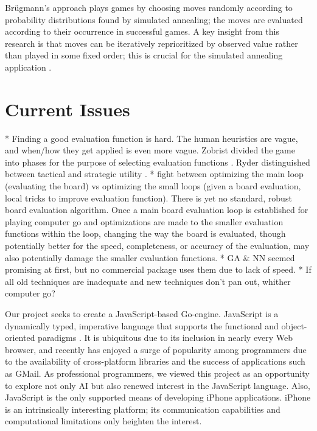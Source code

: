 \documentclass{memoir}
\begin{document}
Br\"ugmann's approach plays games by choosing moves randomly according to probability distributions found by simulated annealing; the moves are evaluated according to their occurrence in successful games. A key insight from this research is that moves can be iteratively reprioritized by observed value rather than played in some fixed order; this is crucial for the simulated annealing application \cite{Bruegmann93}.

\chapter{Current Issues}

    * Finding a good evaluation function is hard. The human heuristics are vague, and when/how they get applied is even more vague. Zobrist divided the game into phases for the purpose of selecting evaluation functions \cite{Zobrist1970b}. Ryder distinguished between tactical and strategic utility \cite{Burmeister}.
    * fight between optimizing the main loop (evaluating the board) vs optimizing the small loops (given a board evaluation, local tricks to improve evaluation function). There is yet no standard, robust board evaluation algorithm. Once a main board evaluation loop is established for playing computer go and optimizations are made to the smaller evaluation functions within the loop, changing the way the board is evaluated, though potentially better for the speed, completeness, or accuracy of the evaluation, may also potentially damage the smaller evaluation functions.
    * GA \& NN seemed promising at first, but no commercial package uses them due to lack of speed.
    * If all old techniques are inadequate and new techniques don't pan out, whither computer go? 

Our project seeks to create a JavaScript-based Go-engine. JavaScript is a dynamically typed, imperative language that supports the functional and object-oriented paradigms \cite{ECMA-262}. It is ubiquitous due to its inclusion in nearly every Web browser, and recently has enjoyed a surge of popularity among programmers due to the availability of cross-platform libraries and the success of applications such as GMail. As professional programmers, we viewed this project as an opportunity to explore not only AI but also renewed interest in the JavaScript language. Also, JavaScript is the only supported means of developing iPhone applications. iPhone is an intrinsically interesting platform; its communication capabilities and computational limitations only heighten the interest.
\end{document}
